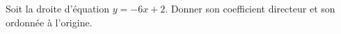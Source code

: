 
\begin{exercice}\label{exosmath-0128}

Soit la droite d'équation \( y=-6x+2\). Donner son coefficient directeur et son ordonnée à l'origine.

\end{exercice}
